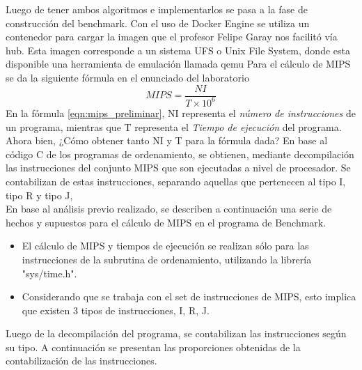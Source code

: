 \documentclass{memoria}
\begin{document}
Luego de tener ambos algoritmos e implementarlos se pasa a la fase de construcción del benchmark.
Con el uso de Docker Engine se utiliza un contenedor para cargar la imagen que el profesor Felipe Garay nos facilitó vía hub. Esta imagen corresponde a un sistema UFS o Unix File System, donde esta disponible una herramienta de emulación llamada qemu
Para el cálculo de MIPS se da la siguiente fórmula en el enunciado del laboratorio
\begin{equation}
\label{eqn:mips_preliminar}
MIPS = \frac{NI}{T \times 10^6}
\end{equation}
En la fórmula \ref{eqn:mips_preliminar}, NI representa el \emph{número de instrucciones} de un programa, mientras que T representa el \emph{Tiempo de ejecución} del programa.\cite{mips_formula}
Ahora bien, ¿Cómo obtener tanto NI y T para la fórmula dada?
En base al código C de los programas de ordenamiento, se obtienen, mediante decompilación las instrucciones del conjunto MIPS que son ejecutadas a nivel de procesador. Se contabilizan de estas instrucciones, separando aquellas que pertenecen al tipo I, tipo R y tipo J, 
\\
En base al análisis previo realizado, se describen a continuación una serie de hechos y supuestos para el cálculo de MIPS en el programa de Benchmark.
\begin{itemize}
\item El cálculo de MIPS y tiempos de ejecución se realizan sólo para las instrucciones de la subrutina de ordenamiento, utilizando la librería {"sys/time.h"}.
\item Considerando que se trabaja con el set de instrucciones de MIPS, esto implica que existen 3 tipos de instrucciones, I, R, J.
\end{itemize}
Luego de la decompilación del programa, se contabilizan las instrucciones según su tipo. A continuación se presentan las proporciones obtenidas de la contabilización de las instrucciones.


\end{document}
